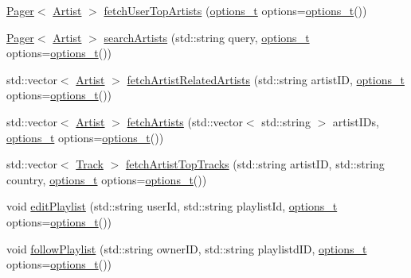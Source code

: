 \begin{DoxyCompactItemize}
\item 
\mbox{\hyperlink{class_pager}{Pager}}$<$ \mbox{\hyperlink{class_artist}{Artist}} $>$ \mbox{\hyperlink{class_spotify_a_p_i_ac505c806265073b2418691799e3573c2}{fetch\+User\+Top\+Artists}} (\mbox{\hyperlink{_spotify_a_p_i_8h_a0ff5cac1a4007bb330b7d9939650c283}{options\+\_\+t}} options=\mbox{\hyperlink{_spotify_a_p_i_8h_a0ff5cac1a4007bb330b7d9939650c283}{options\+\_\+t}}())
\item 
\mbox{\hyperlink{class_pager}{Pager}}$<$ \mbox{\hyperlink{class_artist}{Artist}} $>$ \mbox{\hyperlink{class_spotify_a_p_i_aae86009494fbfe39fb6c253acaeb5819}{search\+Artists}} (std\+::string query, \mbox{\hyperlink{_spotify_a_p_i_8h_a0ff5cac1a4007bb330b7d9939650c283}{options\+\_\+t}} options=\mbox{\hyperlink{_spotify_a_p_i_8h_a0ff5cac1a4007bb330b7d9939650c283}{options\+\_\+t}}())
\item 
std\+::vector$<$ \mbox{\hyperlink{class_artist}{Artist}} $>$ \mbox{\hyperlink{class_spotify_a_p_i_a1160dfb028f8d35e044016bfde9249db}{fetch\+Artist\+Related\+Artists}} (std\+::string artist\+ID, \mbox{\hyperlink{_spotify_a_p_i_8h_a0ff5cac1a4007bb330b7d9939650c283}{options\+\_\+t}} options=\mbox{\hyperlink{_spotify_a_p_i_8h_a0ff5cac1a4007bb330b7d9939650c283}{options\+\_\+t}}())
\item 
std\+::vector$<$ \mbox{\hyperlink{class_artist}{Artist}} $>$ \mbox{\hyperlink{class_spotify_a_p_i_af0dbdda3a69fea10e88175e033884c8a}{fetch\+Artists}} (std\+::vector$<$ std\+::string $>$ artist\+I\+Ds, \mbox{\hyperlink{_spotify_a_p_i_8h_a0ff5cac1a4007bb330b7d9939650c283}{options\+\_\+t}} options=\mbox{\hyperlink{_spotify_a_p_i_8h_a0ff5cac1a4007bb330b7d9939650c283}{options\+\_\+t}}())
\item 
std\+::vector$<$ \mbox{\hyperlink{class_track}{Track}} $>$ \mbox{\hyperlink{class_spotify_a_p_i_a29a225f2f09d8a189b9c6214423cfe7e}{fetch\+Artist\+Top\+Tracks}} (std\+::string artist\+ID, std\+::string country, \mbox{\hyperlink{_spotify_a_p_i_8h_a0ff5cac1a4007bb330b7d9939650c283}{options\+\_\+t}} options=\mbox{\hyperlink{_spotify_a_p_i_8h_a0ff5cac1a4007bb330b7d9939650c283}{options\+\_\+t}}())
\item 
void \mbox{\hyperlink{class_spotify_a_p_i_ae9364eeba6428a021dd34dd3976acc99}{edit\+Playlist}} (std\+::string user\+Id, std\+::string playlist\+Id, \mbox{\hyperlink{_spotify_a_p_i_8h_a0ff5cac1a4007bb330b7d9939650c283}{options\+\_\+t}} options=\mbox{\hyperlink{_spotify_a_p_i_8h_a0ff5cac1a4007bb330b7d9939650c283}{options\+\_\+t}}())
\item 
void \mbox{\hyperlink{class_spotify_a_p_i_abc2a6bac621bfc0e2301147a63d325e1}{follow\+Playlist}} (std\+::string owner\+ID, std\+::string playlistd\+ID, \mbox{\hyperlink{_spotify_a_p_i_8h_a0ff5cac1a4007bb330b7d9939650c283}{options\+\_\+t}} options=\mbox{\hyperlink{_spotify_a_p_i_8h_a0ff5cac1a4007bb330b7d9939650c283}{options\+\_\+t}}())

\end{DoxyCompactItemize}
